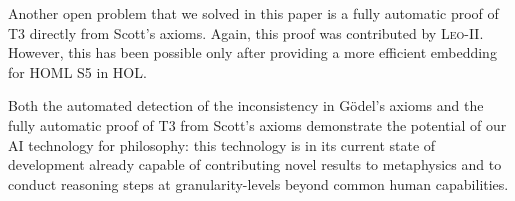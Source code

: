\documentclass{article}
\begin{document}
Another open problem that we solved in this paper is a fully automatic
proof of T3 directly from Scott's axioms. Again, this proof was
contributed by \textsc{Leo-II}. However, this has been possible only
after providing a more efficient embedding for HOML S5 in HOL. 

Both the automated detection of the inconsistency in G\"odel's axioms
and the fully automatic proof of T3 from Scott's axioms demonstrate
the potential of our AI technology for philosophy: this technology is
in its current state of development already capable of contributing novel results to
metaphysics and to conduct reasoning steps at granularity-levels
beyond common human capabilities.  %

















\end{document}
